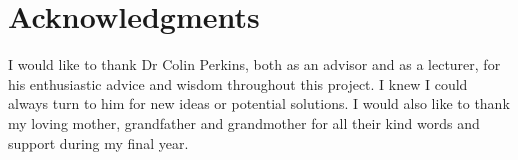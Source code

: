 \documentclass{mpaper}
\begin{document}
\section{Acknowledgments}

\noindent I would like to thank Dr Colin Perkins, both as an advisor and as a lecturer, for his enthusiastic advice and wisdom throughout this project. I knew I could always turn to him for new ideas or potential solutions. I would also like to thank my loving mother, grandfather and grandmother for all their kind words and support during my final year.



\end{document}
